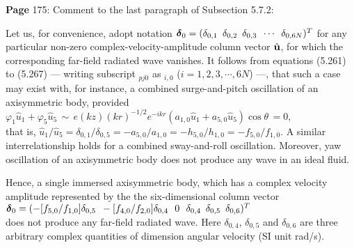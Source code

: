 \documentclass[a4paper,12pt]{article}
\newcommand{\bdelta}{\mbox{\boldmath ${\rm \delta}$}}
\begin{document}
\noindent %
{\bf Page} 175: Comment to the last paragraph of Subsection 5.7.2:

\vspace{0.2cm} \noindent
Let us, for convenience, adopt notation ${\bdelta}_0 = (\delta_{0,1} \,\,\, \delta_{0,2} \,\,\, \delta_{0,3} \,\,\, \cdots \,\,\, \delta_{0,6N})^T$ for any particular non-zero complex-velocity-amplitude column vector $\hat {\bf u}$, for which the corresponding far-field radiated wave vanishes. It follows from equations (5.261) to (5.267) --- writing subscript $_{pj0}$ as $_{i,0}$ ($i = 1, 2, 3, \cdots, 6N$) ---, that such a case may exist with, for instance, a combined surge-and-pitch oscillation of an axisymmetric body, provided \\
$\varphi_1 \hat u_1 + \varphi_5 \hat u_5 \, \sim \,  e(kz)(kr)^{- 1/2}
          e^{-ikr} (a_{1,0}\hat u_1 + a_{5,0}\hat u_5) \cos \theta \,   = 0$, \\
that is, $\hat u_1/\hat u_5 = \delta_{0,1}/\delta_{0,5} =  - a_{5,0}/a_{1,0} =  - h_{5,0}/h_{1,0} =  - f_{5,0}/f_{1,0}$. A similar interrelationship holds for a combined sway-and-roll oscillation. Moreover, yaw oscillation of an axisymmetric body does not produce any wave  in an ideal fluid. %

Hence, a single immersed axisymmetric body, which has a complex velocity amplitude represented by the the six-dimensional column vector \\  
${\bdelta}_0 = (- [f_{5,0}/f_{1,0}] \delta_{0,5} \,\,\, - [f_{4,0}/f_{2,0}] \delta_{0,4} \,\,\,\, 0 \,\,\,\, \delta_{0,4}\,\,\, \delta_{0,5}\,\,\, \delta_{0,6})^T$ \\
does not produce any far-field radiated wave. Here $\delta_{0,4}$, $\delta_{0,5}$ and $\delta_{0,6}$ are three arbitrary complex quantities of dimension angular velocity (SI unit rad/s).
\end{document}
